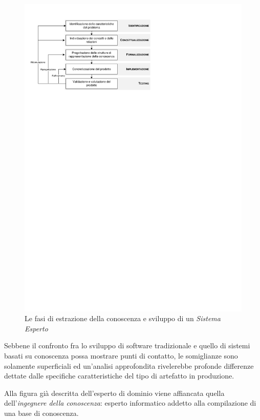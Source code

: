 \begin{figure}[h]
\centering
\includegraphics[viewport=16 607 346 801]{Immagini/Capitolo1/Fasi-acquisizione.pdf}
\caption{Le fasi di estrazione della conoscenza e sviluppo di un \emph{Sistema Esperto}}\label{fig:fasi-progettazione}
\end{figure}


Sebbene il confronto fra lo sviluppo di software tradizionale e quello di sistemi basati su conoscenza possa mostrare punti di contatto, le somiglianze sono solamente superficiali ed un'analisi approfondita rivelerebbe profonde differenze dettate dalle specifiche caratteristiche del tipo di artefatto in produzione.~\cite{esposito2012icse}

Alla figura già descritta dell'esperto di dominio viene affiancata quella dell'\emph{ingegnere della conoscenza}: esperto informatico addetto alla compilazione di una base di conoscenza.

